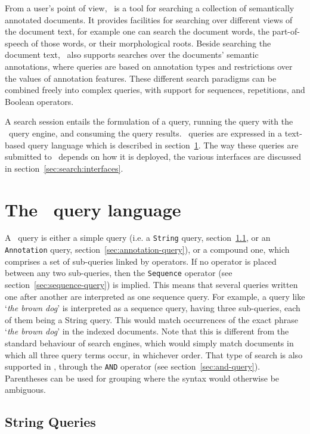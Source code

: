 From a user's point of view, \Mimir\ is a tool for searching a collection of
semantically annotated documents.  It provides facilities for searching over
different views of the document text, for example one can search the document
words, the part-of-speech of those words, or their morphological roots. Beside
searching the document text, \Mimir\ also supports searches over the documents'
semantic annotations, where queries are based on annotation types and
restrictions over the values of annotation features. These different search
paradigms can be combined freely into complex queries, with support for
sequences, repetitions, and Boolean operators.

A search session entails the formulation of a query, running the query with the
\Mimir\ query engine, and consuming the query results.  \Mimir\ queries are
expressed in a text-based query language which is described in
section~\ref{sec:search:ql}.  The way these queries are submitted to \Mimir\
depends on how it is deployed, the various interfaces are discussed in
section~\ref{sec:search:interfaces}.


\section{The \Mimir\ query language}\label{sec:search:ql}

A \Mimir\ query is either a simple query (i.e. a {\tt String} query,
section~\ref{sec:string-query}, or an {\tt Annotation} query,
section~\ref{sec:annotation-query}), or a compound one, which comprises a set of
sub-queries linked by operators. If no operator is placed between any two
sub-queries, then the {\tt Sequence} operator (see
section~\ref{sec:sequence-query}) is implied. This means that several queries
written one after another are interpreted as one sequence query. For example, a
query like `{\it the brown dog}' is interpreted as a sequence query, having
three sub-queries, each of them being a String query. This would match
occurrences of the exact phrase `{\it the brown dog}' in the indexed documents.
Note that this is different from the standard behaviour of search engines,
which would simply match documents in which all three query terms occur, in
whichever order. That type of search is also supported in \Mimir, through the
{\tt AND} operator (see section~\ref{sec:and-query}).  Parentheses can be used
for grouping where the syntax would otherwise be ambiguous.

\subsection{String Queries}\label{sec:string-query}

